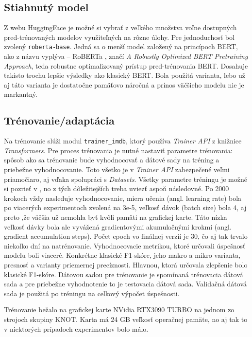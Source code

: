 \subsection*{Stiahnutý model}

Z webu HuggingFace je možné si vybrať z veľkého množstva voľne dostupných pred-trénovaných modelov využiteľných na rôzne úlohy. Pre jednoduchosť bol zvolený {\tt roberta-base}. Jedná sa o menší model založený na princípoch BERT, ako z názvu vyplýva -- RoBERTa \cite{Liu:2019}, značí \textit{A Robustly Optimized BERT Pretraining Approach}, teda robustne optimalizovaný prístup pred-trénovania BERT. Dosahuje takisto trochu lepšie výsledky ako klasický BERT. Bola použitá  varianta, lebo už aj táto varianta je dostatočne pamäťovo náročná a prínos väčšieho modelu nie je markantný.

\subsection*{Trénovanie/adaptácia}

Na trénovanie slúži modul {\tt trainer\_imdb}, ktorý používa \textit{Trainer API} z knižnice \textit{Transformers}. Pre proces trénovania je nutné nastaviť parametre trénovania: spôsob ako sa trénovanie bude vyhodnocovať a dátové sady na tréning a priebežne vyhodnocovanie. Toto všetko je v \textit{Trainer API} zabezpečené veľmi priamočiaro, aj vďaka spolupráci s \textit{Datasets}. Všetky parametre tréningu je možné si pozrieť v , no z tých dôležitejších treba uviezť aspoň následovné. Po 2000 krokoch vždy nasleduje vyhodnocovanie, miera učenia (angl. learning rate) bola po viacerých experimentoch zvolená na 3e-5, veľkosť dávok (batch size) bola 4, aj preto ,že väčšia už nemohla byť kvôli pamäti na grafickej karte. Táto nízka veľkosť dávky bola ale vyvážená gradientovými akumulačnými krokmi (angl. gradient accumulation steps). Počet epoch vo finálnej verzií je 30, čo aj tak trvalo niekoľko dní na natrénovanie. Vyhodnocovacie metrikou, ktoré určovali úspešnosť modelu boli viaceré. Konkrétne klasické F1-skóre, jeho makro a mikro varianta, presnosť a varianty priemernej precíznosti. Hlavnou, ktorá určovala zlepšenie bolo klasické F1-skóre. Dátovou sadou pre trénovanie je spomínaná trénovacia dátová sada a pre priebežne vyhodnotenie to je testovacia dátová sada. Validačná dátová sada je použitá po tréningu na celkový výpočet úspešnosti. 

Trénovanie bežalo na grafickej karte NVidia RTX3090 TURBO na jednom zo strojoch skupiny KNOT. Karta má 24 GB veľkosť operačnej pamäte, no aj tak to v niektorých prípadoch experimentov bolo málo. 

